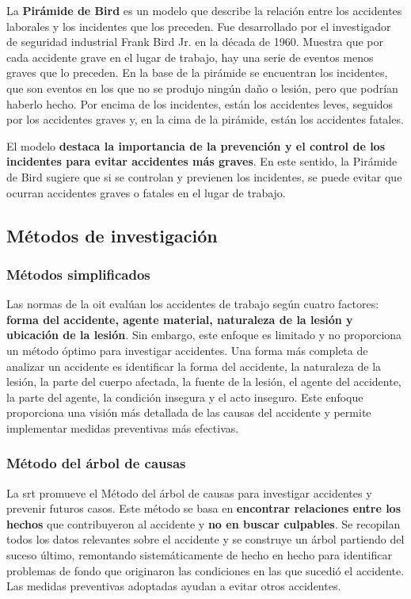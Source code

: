 La \textbf{Pirámide de Bird} es un modelo que describe la relación entre los 
accidentes laborales y los incidentes que los preceden. Fue desarrollado por el
investigador de seguridad industrial Frank Bird Jr. en la década de 1960. 
Muestra que por cada accidente grave en el lugar de trabajo, hay una serie de 
eventos menos graves que lo preceden. En la base de la pirámide se encuentran 
los incidentes, que son eventos en los que no se produjo ningún daño o lesión, 
pero que podrían haberlo hecho. Por encima de los incidentes, están los 
accidentes leves, seguidos por los accidentes graves y, en la cima de la 
pirámide, están los accidentes fatales.

El modelo \textbf{destaca la importancia de la prevención y el control de los 
    incidentes para evitar accidentes más graves}. En este sentido, la 
Pirámide de Bird sugiere que si se controlan y previenen los incidentes, se 
puede evitar que ocurran accidentes graves o fatales en el lugar de trabajo.

\subsection{Métodos de investigación}

\subsubsection{Métodos simplificados}

Las normas de la \acrfull{oit} evalúan los accidentes de trabajo según cuatro 
factores: \textbf{forma del accidente, agente material, naturaleza de la lesión
    y ubicación de la lesión}. Sin embargo, este enfoque es limitado y no 
proporciona un método óptimo para investigar accidentes. Una forma más completa
de analizar un accidente es identificar la forma del accidente, la naturaleza
de la lesión, la parte del cuerpo afectada, la fuente de la lesión, el agente
del accidente, la parte del agente, la condición insegura y el acto inseguro.
Este enfoque proporciona una visión más detallada de las causas del accidente y
permite implementar medidas preventivas más efectivas.

\subsubsection{Método del árbol de causas}

La \acrfull{srt} promueve el Método del árbol de causas para investigar 
accidentes y prevenir futuros casos. Este método se basa en \textbf{encontrar 
    relaciones entre los hechos} que contribuyeron al accidente y \textbf{no en
    buscar culpables}. Se recopilan todos los datos relevantes sobre el 
accidente y se construye un árbol partiendo del suceso último, remontando 
sistemáticamente de hecho en hecho para identificar problemas de fondo que 
originaron las condiciones en las que sucedió el accidente. Las medidas 
preventivas adoptadas ayudan a evitar otros accidentes.

